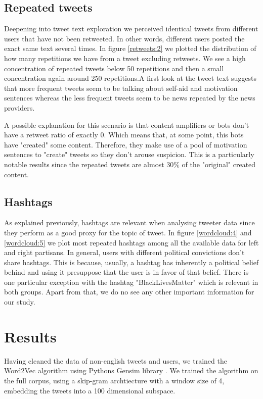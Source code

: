 \documentclass[12pt, authoryear]{elsarticle}
\begin{document}
\subsection{Repeated tweets}
Deepening into tweet text exploration we perceived identical tweets from different users that have not been retweeted. In other words, different users posted the exact same text several times. In figure \ref{retweets:2} we plotted the distribution of how many repetitions we have from a tweet excluding retweets. We see a high concentration of repeated tweets below 50 repetitions and then a small concentration again around 250 repetitions.A first look at the tweet text suggests that more frequent tweets seem to be talking about self-aid and motivation sentences whereas the less frequent tweets seem to be news repeated by the news providers.

A possible explanation for this scenario is that content amplifiers or bots don't have a retweet ratio of exactly 0. Which means that, at some point, this bots have "created" some content. Therefore, they make use of a pool of motivation sentences to "create" tweets so they don't arouse suspicion.
This is a particularly notable results since the repeated tweets are almost 30\% of the "original" created content.

\subsection{Hashtags}
As explained previously, hashtags are relevant when analysing tweeter data since they perform as a good proxy for the topic of tweet. In figure \ref{wordcloud:4} and \ref{wordcloud:5} we plot most repeated hashtags among all the available data for left and right partisans. In general, users with different political convictions don't share hashtags. This is because, usually, a hashtag has inherently a political belief behind and using it presuppose that the user is in favor of that belief. There is one particular exception with the hashtag "BlackLivesMatter" which is relevant in both groups. Apart from that, we do no see any other important information for our study.

\section{Results}

Having cleaned the data of non-english tweets and users, we trained the Word2Vec algorithm using Pythons Gensim library \cite{rehurek_lrec}. We trained the algorithm on the full corpus, using a skip-gram archtiecture with a window size of 4, embedding the tweets into a 100 dimensional subspace. 
\end{document}
